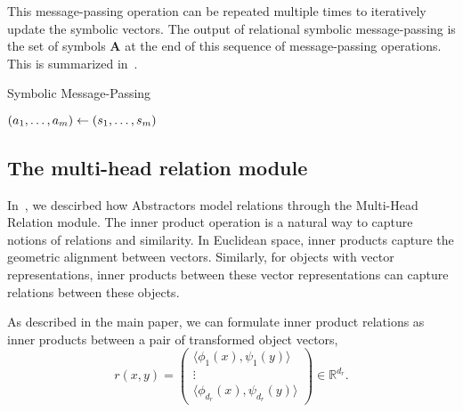 This message-passing operation can be repeated multiple times to iteratively update the symbolic vectors.  The output of relational symbolic message-passing is the set of symbols $\bm{A}$ at the end of this sequence of message-passing operations. This is summarized in~.

\begin{algorithm}[ht!]
	\caption{Symbolic Message-Passing}\label{alg:symbolic_mp}

	\vspace{1em}

	\((a_1, \ldots, a_m) \gets (s_1, \ldots, s_m)\)

\end{algorithm}

\subsection{The multi-head relation module}

In~, we descirbed how Abstractors model relations through the Multi-Head Relation module. The inner product operation is a natural way to capture notions of relations and similarity. In Euclidean space, inner products capture the geometric alignment between vectors. Similarly, for objects with vector representations, inner products between these vector representations can capture relations between these objects.

As described in the main paper, we can formulate inner product relations as inner products between a pair of transformed object vectors,
\begin{equation*}
    r(x,y) = \begin{pmatrix}\langle \phi_1(x), \psi_1(y) \rangle \\ \vdots \\ \langle \phi_{d_r}(x), \psi_{d_r}(y) \rangle \end{pmatrix} \in \mathbb{R}^{d_r}.
\end{equation*}

